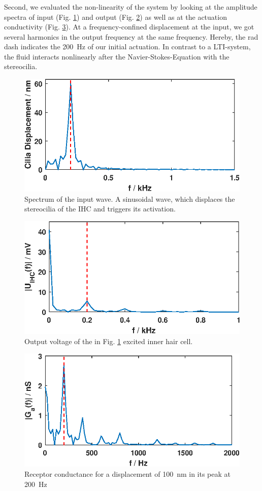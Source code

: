 \clearpage
\subsubsection{}
Second, we evaluated the non-linearity of the system by looking at the amplitude spectra of input (Fig. \ref{fig:signal:U_in}) and output (Fig. \ref{fig:signal:U_ihc})  as well as at the actuation conductivity (Fig. \ref{fig:signal:ga}). At a frequency-confined displacement at the input, we got several harmonics in the output frequency at the same frequency. Hereby, the rad dash indicates the \SI{200}{\hertz} of our initial actuation. In contrast to a LTI-system, the fluid interacts nonlinearly after the Navier-Stokes-Equation with the stereocilia.

\begin{figure}[h] 
  \centering
  \includegraphics[width=.5\linewidth]{ue3/U_in_200Hz_100nm.eps} %
  \caption{Spectrum of the input wave. A sinusoidal wave, which displaces the stereocilia of the IHC and triggers its activation.}
  \label{fig:signal:U_in}
\end{figure}
\begin{figure}[h] 
  \centering
  \includegraphics[width=.5\linewidth]{ue3/U_IHC_200Hz_100nm.eps} %
  \caption{Output voltage of the in Fig. \ref{fig:signal:U_in} excited inner hair cell.}
  \label{fig:signal:U_ihc}
\end{figure}
\begin{figure}[h] 
  \centering
  \includegraphics[width=.5\linewidth]{ue3/G_a_200Hz_100nm.eps} %
  \caption{Receptor conductance for a displacement of \SI{100}{\nano\meter} in its peak at \SI{200}{\hertz}}
  \label{fig:signal:ga}
\end{figure}





